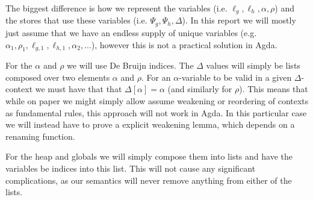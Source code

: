 The biggest difference is how we represent the variables (i.e.
$\ell_g, \ell_h, \alpha, \rho$) and the stores that use these variables
(i.e. $\Psi_g, \Psi_h, \Delta$). In this report we will mostly just assume that
we have an endless supply of unique variables (e.g.
$\alpha_1, \rho_1, \ell_{g,1}, \ell_{h,1}, \alpha_2, \dots$), however this is
not a practical solution in Agda.


For the $\alpha$ and $\rho$ we will use De Bruijn indices. The $\Delta$ values
will simply be lists composed over two elements $\mathbb{\alpha}$ and
$\mathtt{\rho}$. For an $\alpha$-variable to be valid in a given
$\Delta$-context we must have that that $\Delta[\alpha] = \mathtt{\alpha}$ (and
similarly for $\rho$). This means that while on paper we might simply allow
assume weakening or reordering of contexts as fundamental rules, this approach
will not work in Agda. In this particular case we will instead have to prove a
explicit weakening lemma, which depends on a renaming function.

For the heap and globals we will simply compose them into lists and have the
variables be indices into this list. This will not cause any significant
complications, as our semantics will never remove anything from either of the
lists.
